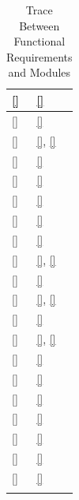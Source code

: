 \documentclass[12pt, titlepage]{article}
\newcommand{\descriptiveid}[1]{{\noexpandarg\StrSubstitute{#1}{_}{\textunderscore\allowbreak}[\idtmp]\texttt{\idtmp}}}
\newcommand{\idref}[1]{\hyperref[#1]{\descriptiveid{#1}}}
\newcommand{\srsurl}{https://ayushpatel2026.github.io/Keystone/SRS/SRS.pdf}
\newcommand{\srsref}[1]{\href{\srsurl\#nameddest=#1}{\descriptiveid{#1}}}
\begin{document}
\begin{longtable}{p{} p{}}
  \srsref{FR_ReferenceMaterial} & \idref{M_CourseManagement} \\ \hline
  \srsref{FR_RequiredActionsList} & \idref{M_Checklist} \\ \hline
  \srsref{FR_ActionRequiredEmail} & \idref{M_Notifications}, \idref{M_Checklist} \\ \hline
  \srsref{FR_ReadCourseInformation} & \idref{M_CourseReport} \\ \hline
  \srsref{FR_ExportCourseInformation} & \idref{M_CourseReport} \\ \hline
  \srsref{FR_MacSSO} & \idref{M_Authentication} \\ \hline
  \srsref{FR_AuthorizationRBAC} & \idref{M_Authorization} \\ \hline
  \srsref{FR_UpdateRoles} & \idref{M_Authorization} \\ \hline
  \srsref{FR_ExternalSupervisorVerification} & \idref{M_Authorization}, \idref{M_Authentication} \\ \hline
  \srsref{FR_ExternalSupervisorScope} & \idref{M_Authorization} \\ \hline
  \srsref{FR_LogExternalErrors} & \idref{M_AuditLog}, \idref{M_Notifications} \\ \hline
  \srsref{FR_RejectComponentDisable} & \idref{M_CourseManagement} \\ \hline
  \srsref{FR_DisplayTimestamps} & \idref{M_UserInterface}, \idref{M_Persistence} \\ \hline
  \srsref{FR_DurableNotifications} & \idref{M_Notifications} \\ \hline
  \srsref{FR_ReverifyUsers} & \idref{M_Authentication} \\ \hline
  \srsref{FR_ImportEnrollment} & \idref{M_Enrollment} \\ \hline
  \srsref{FR_UpdateEnrollment} & \idref{M_Enrollment} \\ \hline
  \srsref{FR_EnrollmentDiscrepency} & \idref{M_Enrollment} \\ \hline
  \srsref{FR_NeedsGroup} & \idref{M_StudentsTeams} \\ \hline
  \srsref{FR_AssignTA} & \idref{M_StudentsTeams} \\ \hline

  \bottomrule

  \caption{Trace Between Functional Requirements and Modules}
  \label{TblRT}
\end{longtable}
\end{document}
